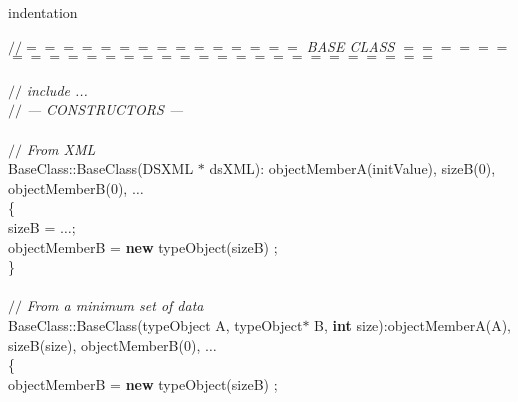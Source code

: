 %
%
\expandafter\ifx\csname indentation\endcsname\relax%
\newlength{\indentation}\fi
\setlength{\indentation}{0.5em}
\begin{flushleft}
{$//$\it{}$=$$=$$=$$=$$=$$=$$=$$=$$=$$=$$=$$=$$=$$=$$=$ BASE CLASS $=$$=$$=$$=$$=$$=$$=$$=$$=$$=$$=$$=$$=$$=$$=$$=$$=$$=$$=$$=$$=$$=$$=$$=$$=$$=$$=$$=$$=${}\mbox{}\\
}\mbox{}\\
{$//$\it{} include ...{}\mbox{}\\
}{$//$\it{} --- CONSTRUCTORS ---{}\mbox{}\\
}\mbox{}\\
{$//$\it{} From XML {}\mbox{}\\
}BaseClass::BaseClass(DSXML $\ast$ dsXML): objectMemberA(initValue), sizeB(0), objectMemberB(0), $\ldots$ \mbox{}\\
\{\mbox{}\\
\hspace*{2\indentation}sizeB = $\ldots$;\mbox{}\\
\hspace*{2\indentation}objectMemberB = {\bf new} typeObject(sizeB) ;\mbox{}\\
\} \mbox{}\\
\hspace*{1\indentation}\mbox{}\\
{$//$\it{} From a minimum set of data{}\mbox{}\\
}BaseClass::BaseClass(typeObject A, typeObject$\ast$ B, {\bf int} size):objectMemberA(A), sizeB(size), objectMemberB(0), $\ldots$ \mbox{}\\
\{\mbox{}\\
\hspace*{2\indentation}objectMemberB = {\bf new} typeObject(sizeB) ;\mbox{}\\
\end{flushleft}
